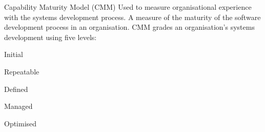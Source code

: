 \documentclass[\main/notes.tex]{subfiles}
\begin{document}
			\begin{definition}{Capability Maturity Model (CMM)}
				Used to measure organisational experience with the systems development process. A measure of the maturity of the software development process in an organisation. CMM grades an organisation's systems development using five levels:
				\begin{center}
					\begin{enumerate*}[nosep, itemjoin={\quad}]
						\item Initial
						\item Repeatable
						\item Defined
						\item Managed
						\item Optimised
					\end{enumerate*}
				\end{center}
			\end{definition}
\end{document}
